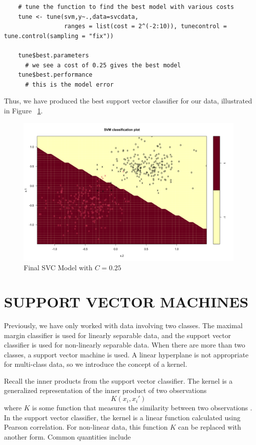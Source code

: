 \documentclass[12pt]{article}
\begin{document}
\begin{verbatim}
    # tune the function to find the best model with various costs
    tune <- tune(svm,y~.,data=svcdata, 
                 ranges = list(cost = 2^(-2:10)), tunecontrol = tune.control(sampling = "fix"))
    
    tune$best.parameters
      # we see a cost of 0.25 gives the best model
    tune$best.performance
      # this is the model error
\end{verbatim}

Thus, we have produced the best support vector classifier for our data, illustrated in Figure ~\ref{fig_svc_final_model}.

\begin{figure}[ht]
    \centering
    \includegraphics[width=5in]{Figures/svc/svc_final_model.png}
    \caption{Final SVC Model with \(C = 0.25\)}
    \label{fig_svc_final_model}
\end{figure}

\section{SUPPORT VECTOR MACHINES}

Previously, we have only worked with data involving two classes. The maximal margin classifier is used for linearly separable data, and the support vector classifier is used for non-linearly separable data. When there are more than two classes, a support vector machine is used. A linear hyperplane is not appropriate for multi-class data, so we introduce the concept of a kernel.

Recall the inner products from the support vector classifier. The kernel is a generalized representation of the inner product of two observations \[K(x_i,x_i')\] where \(K\) is some function that measures the similarity between two observations \citep{introstatlearning}. In the support vector classifier, the kernel is a linear function calculated using Pearson correlation. For non-linear data, this function \(K\) can be replaced with another form. Common quantities include
\end{document}
